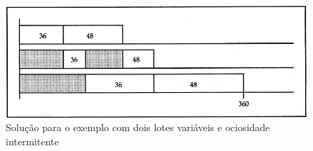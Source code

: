 \begin{figure}[!ht]
    \centering
    \includegraphics[scale=0.4]{Referencial/Figuras/Ls_ex4}
    \caption{Solução para o exemplo com dois lotes variáveis e ociosidade intermitente}
    \label{fig:LS_ex4}
\end{figure}